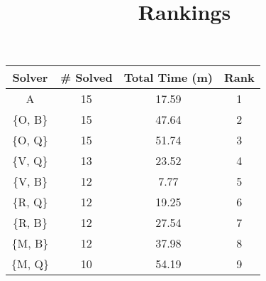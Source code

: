 \documentclass{article}
\title{Rankings}
\begin{document}
\maketitle

\begin{table}[ht!]
\centering

\begin{tabular}{|c||c|c||c|}\hline
Solver   & \# Solved & Total Time (m) & Rank \\\hline\hline
A        & 15        & 17.59     &1\\\hline
\{O, B\} & 15        & 47.64     &2\\\hline
\{O, Q\} & 15        & 51.74     &3\\\hline
\{V, Q\} & 13        & 23.52     &4\\\hline
\{V, B\} & 12        & 7.77      &5\\\hline
\{R, Q\} & 12        & 19.25     &6\\\hline
\{R, B\} & 12        & 27.54     &7\\\hline
\{M, B\} & 12        & 37.98     &8\\\hline
\{M, Q\} & 10        & 54.19     &9\\\hline
\end{tabular}
\end{table}
\end{document}

